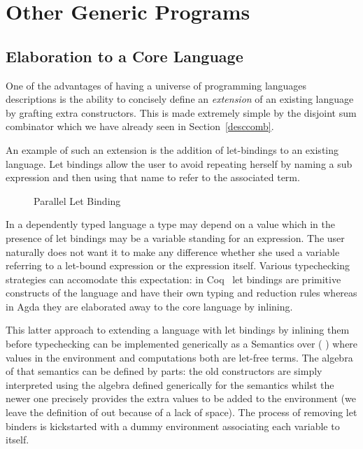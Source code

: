 \section{Other Generic Programs}

\subsection{Elaboration to a Core Language}

One of the advantages of having a universe of programming languages
descriptions is the ability to concisely define an \emph{extension}
of an existing language by grafting extra constructors. This is made
extremely simple by the disjoint sum combinator  which we
have already seen in Section~\ref{desccomb}.

An example of such an extension is the addition of let-bindings to
an existing language. Let bindings allow the user to avoid repeating
herself by naming a sub expression and then using that name to refer
to the associated term.

\begin{figure}[h]
\begin{minipage}{0.45\textwidth}
\end{minipage}\hspace{2em}
\begin{minipage}{0.45\textwidth}
\end{minipage}
\caption{Parallel Let Binding}
\end{figure}

In a dependently typed language a type may depend on a value which
in the presence of let bindings may be a variable standing for an
expression. The user naturally does not want it to make any difference
whether she used a variable referring to a let-bound expression or
the expression itself. Various typechecking strategies can accomodate
this expectation: in Coq~\cite{Coq:manual} let bindings are primitive
constructs of the language and have their own typing and reduction
rules whereas in Agda they are elaborated away to the core language
by inlining.

This latter approach to extending a language  with let bindings
by inlining them before typechecking can be implemented generically as
a Semantics over ( ) where values in the environment and
computations both are let-free terms. The algebra of that semantics can
be defined by parts: the old constructors are simply interpreted using
the algebra defined generically for the  semantics whilst
the newer one precisely provides the extra values to be added to the
environment (we leave the definition of  out because of a lack
of space). The process of removing let binders is kickstarted with a
dummy environment associating each variable to itself.

